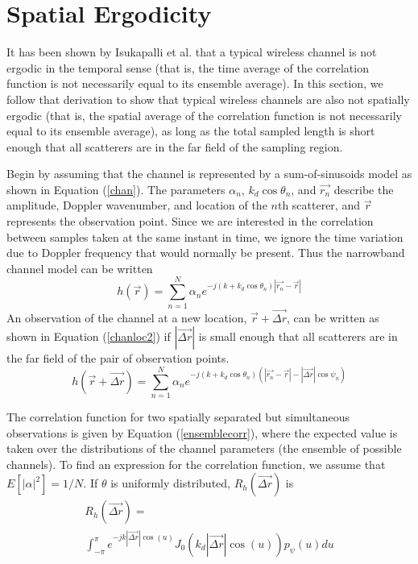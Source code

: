 \documentclass[conference]{ieeetran}
\begin{document}
\section{Spatial Ergodicity}
 It has been shown by Isukapalli et al. \cite{isukapalli2006} that a typical wireless channel is not ergodic in the temporal sense (that is, the time average of the correlation function is not necessarily equal to its ensemble average).  In this section, we follow that derivation to show that typical wireless channels are also not spatially ergodic (that is, the spatial average of the correlation function is not necessarily equal to its ensemble average), as long as the total sampled length is short enough that all scatterers are in the far field of the sampling region.

Begin by assuming that the channel is represented by a sum-of-sinusoids model as shown in Equation (\ref{chan}).  The parameters $\alpha_n$, $k_d\cos\theta_n$, and $\vec{r_n}$ describe the amplitude, Doppler wavenumber, and location of the $n$th scatterer, and $\vec{r}$ represents the observation point.  Since we are interested in the correlation between samples taken at the same instant in time, we ignore the time variation due to Doppler frequency that would normally be present. Thus the narrowband channel model can be written
\begin{equation}\label{chan}
h(\vec{r})= \sum_{n=1}^N \alpha_n  e^{-j(k+k_d\cos\theta_n)\left|\vec{r_n} - \vec{r}\right|}
\end{equation}
An observation of the channel at a new location, $\vec{r}+\vec{\Delta r}$, can be written as shown in Equation (\ref{chanloc2}) if $|\vec{\Delta r}|$ is small enough that all scatterers are in the far field of the pair of observation points.
\begin{equation}\label{chanloc2}
h(\vec{r}+\vec{\Delta r}) = \sum_{n=1}^N \alpha_n  e^{-j(k+k_d\cos\theta_n)(\left|\vec{r_n}-\vec{r}\right|-|\vec{\Delta r}| \cos \psi_n)}
\end{equation}

The correlation function for two spatially separated but simultaneous observations is given by Equation (\ref{ensemblecorr}), where the expected value is taken over the distributions of the channel parameters (the ensemble of possible channels). To find an expression for the correlation function, we assume that $E[|\alpha|^2]=1/N$.  If $\theta$ is uniformly distributed, $R_h(\vec{\Delta r})$ is
\begin{multline}
R_h(\vec{\Delta r})=\\\int_{-\pi}^{\pi}e^{-j k |\vec{\Delta r}| \cos(u)} J_0(k_d |\vec{\Delta r}| \cos(u))p_{\psi}(u) du 
\end{multline}
\end{document}
